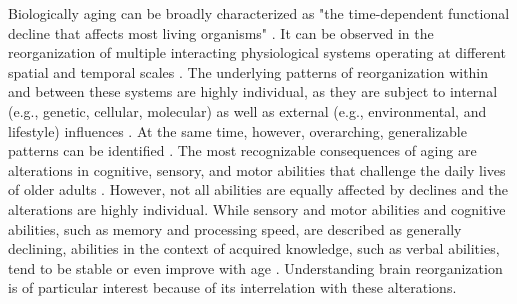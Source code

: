 Biologically aging can be broadly characterized as "the time-dependent functional decline that affects most living organisms" \cite{López-Otín2013}. It can be observed in the reorganization of multiple interacting physiological systems operating at different spatial and temporal scales \cite{Mooney2016}. The underlying patterns of reorganization within and between these systems are highly individual, as they are subject to internal (e.g., genetic, cellular, molecular) as well as external (e.g., environmental, and lifestyle) influences \cite{Smith2020, Mooney2016, Cohen2022}. At the same time, however, overarching, generalizable patterns can be identified \cite{Salthouse2019}. The most recognizable consequences of aging are alterations in cognitive, sensory, and motor abilities that challenge the daily lives of older adults \cite{Li2002}. However, not all abilities are equally affected by declines and the alterations are highly individual. While sensory and motor abilities and cognitive abilities, such as memory and processing speed, are described as generally declining, abilities in the context of acquired knowledge, such as verbal abilities, tend to be stable or even improve with age \cite{Park2009}. Understanding brain reorganization is of particular interest because of its interrelation with these alterations.

